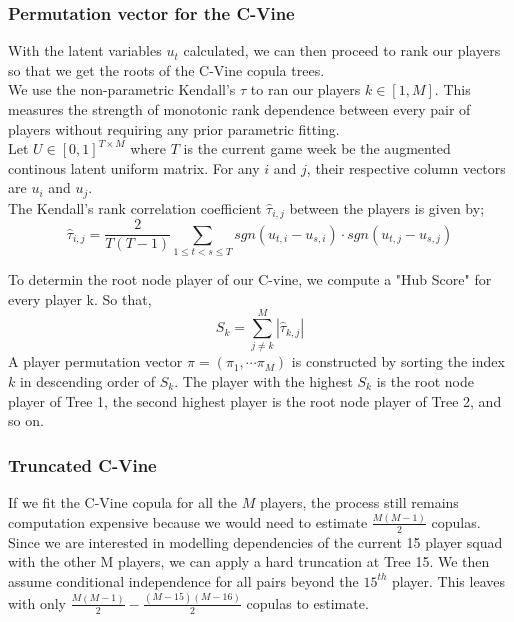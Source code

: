 				\subsubsection{Permutation vector for the C-Vine}
				With the latent variables $u_t$ calculated, we can then proceed to rank our players so that we get the roots of the C-Vine copula trees.\\
				We use the non-parametric Kendall's $\tau$ to ran our players $k \in [1,M]$. This measures the strength of monotonic rank dependence between every pair of players without requiring any prior parametric fitting.\\
				Let $U\in \left[0,1\right]^{T \times M}$ where $T$ is the current game week be the augmented continous latent uniform matrix. For any $i$ and $j$, their respective column vectors are $u_i$ and $u_j$.\\
				The Kendall's rank correlation coefficient $\hat{\tau}_{i,j}$ between the players is given by;
				\begin{equation}\label{Eq:kendall_tau}
					\hat{\tau}_{i,j} = \frac{2}{T\left(T-1\right)}\sum_{1\leqslant t < s \leqslant T}sgn\left(u_{t,i} - u_{s,i}\right)\cdot sgn\left(u_{t,j} - u_{s,j}\right)
				\end{equation}

				To determin the root node player of our C-vine, we compute a "Hub Score" for every player k. So that,
				\begin{equation}\label{Eq:hub_score}
					S_{k} = \sum_{j \neq k}^{M} \left|\hat{\tau}_{k,j} \right|
				\end{equation}
				A player permutation vector $\pi = \left(\pi_1, \cdots \pi_{M}\right)$  is constructed by sorting the index $k$ in descending order of $S_k$. The player with the highest $S_k$ is the root node player of Tree 1, the second highest player is the root node player of Tree 2, and so on.

				\subsubsection{Truncated C-Vine}
				If we fit the C-Vine copula for all the $M$ players, the process still remains computation expensive because we would need to estimate $\frac{M\left(M-1\right)}{2}$ copulas.
				Since we are interested in modelling dependencies of the current 15 player squad with the other M players, we can apply a hard truncation at Tree 15. We then assume conditional independence for all pairs beyond the $15^{th}$ player. This leaves with only $\frac{M\left(M-1\right)}{2} - \frac{\left(M-15\right) \left(M-16\right)}{2}$ copulas to estimate.

